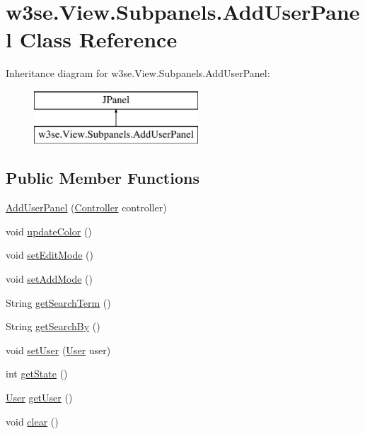 \hypertarget{classw3se_1_1_view_1_1_subpanels_1_1_add_user_panel}{\section{w3se.\-View.\-Subpanels.\-Add\-User\-Panel Class Reference}
\label{classw3se_1_1_view_1_1_subpanels_1_1_add_user_panel}
}
Inheritance diagram for w3se.\-View.\-Subpanels.\-Add\-User\-Panel\-:\begin{figure}[H]
\begin{center}
\leavevmode
\includegraphics[height=2.000000cm]{classw3se_1_1_view_1_1_subpanels_1_1_add_user_panel}
\end{center}
\end{figure}
\subsection*{Public Member Functions}
\begin{DoxyCompactItemize}
\item 
\hyperlink{classw3se_1_1_view_1_1_subpanels_1_1_add_user_panel_a4d3507ae76f6efc06221d7c61be2b4b6}{Add\-User\-Panel} (\hyperlink{interfacew3se_1_1_controller_1_1_controller}{Controller} controller)
\item 
void \hyperlink{classw3se_1_1_view_1_1_subpanels_1_1_add_user_panel_a69bedfe590b7ccae2192e7e037b6a2b5}{update\-Color} ()
\item 
void \hyperlink{classw3se_1_1_view_1_1_subpanels_1_1_add_user_panel_ad95117bcce09b246eccc0d7d3fa79db6}{set\-Edit\-Mode} ()
\item 
void \hyperlink{classw3se_1_1_view_1_1_subpanels_1_1_add_user_panel_a1ee1a9ce5e65c9c4e2a846c656ddb395}{set\-Add\-Mode} ()
\item 
String \hyperlink{classw3se_1_1_view_1_1_subpanels_1_1_add_user_panel_a05948cc4d894c9aa3f075c630c3b962d}{get\-Search\-Term} ()
\item 
String \hyperlink{classw3se_1_1_view_1_1_subpanels_1_1_add_user_panel_acc67fa9cff471782e4ec51bd8d5726fe}{get\-Search\-By} ()
\item 
void \hyperlink{classw3se_1_1_view_1_1_subpanels_1_1_add_user_panel_afb42ecaf44e84377c4835361d83d1dd1}{set\-User} (\hyperlink{classw3se_1_1_model_1_1_base_1_1_user}{User} user)
\item 
int \hyperlink{classw3se_1_1_view_1_1_subpanels_1_1_add_user_panel_ae2d1ae4a989bad3eaad0cd2f0cc9294d}{get\-State} ()
\item 
\hyperlink{classw3se_1_1_model_1_1_base_1_1_user}{User} \hyperlink{classw3se_1_1_view_1_1_subpanels_1_1_add_user_panel_a9e66e4331fafeec5c5ae83548947b041}{get\-User} ()
\item 
void \hyperlink{classw3se_1_1_view_1_1_subpanels_1_1_add_user_panel_a32895b2f259bd8d9aee0c89d2e817cc2}{clear} ()
\end{DoxyCompactItemize}
